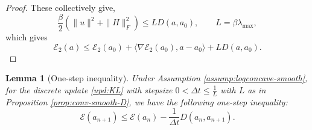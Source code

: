 \documentclass[11pt]{article}
\theoremstyle{plain}
\newtheorem{lemma}[theorem]{Lemma}
\theoremstyle{definition}
\theoremstyle{remark}
\begin{document}
\begin{proof}
    These collectively give, 
    \begin{equation*}
        \frac{\beta }{2} (\| u \|^2 + \| H \|_F^2) \leq L D (a, a_0), \qquad L = \beta  \lambda_{\max},
    \end{equation*}
    which gives
    \begin{equation*}
        \mathcal{E}_2 (a) \leq \mathcal{E}_2 (a_0) + \langle \nabla \mathcal{E}_2 (a_0), a - a_0 \rangle + L D (a, a_0).
    \end{equation*}
\end{proof}

\begin{lemma}[One-step inequality]\label{lem:one-step}
    Under Assumption \ref{assump:logconcave-smooth}, for the discrete update \eqref{upd:KL} with stepsize $0 < \Delta t \leq \frac{1}{L}$ with $L$ as in Proposition \ref{prop:conv-smooth-D}, we have the following one-step inequality:
    \begin{equation*}
        \mathcal{E} (a_{n+1}) \leq \mathcal{E} (a_n) - \frac{1}{\Delta t} D (a_n, a_{n+1}).
    \end{equation*}
\end{lemma}
\end{document}

